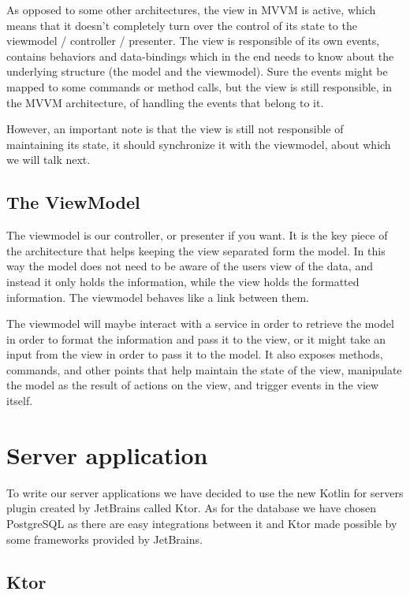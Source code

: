 As opposed to some other architectures, the view in MVVM is active, which means that it doesn't completely turn over the control of its state to the viewmodel / controller / presenter. The view is responsible of its own events, contains behaviors and data-bindings which in the end needs to know about the underlying structure (the model and the viewmodel). Sure the events might be mapped to some commands or method calls, but the view is still responsible, in the MVVM architecture, of handling the events that belong to it.

However, an important note is that the view is still not responsible of maintaining its state, it should synchronize it with the viewmodel, about which we will talk next.

\subsection{The ViewModel}
\label{subsec:ch3sec1subsec3}

\par The viewmodel is our controller, or presenter if you want. It is the key piece of the architecture that helps keeping the view separated form the model. In this way the model does not need to be aware of the users view of the data, and instead it only holds the information, while the view holds the formatted information. The viewmodel behaves like a link between them.

The viewmodel will maybe interact with a service in order to retrieve the model in order to format the information and pass it to the view, or it might take an input from the view in order to pass it to the model. It also exposes methods, commands, and other points that help maintain the state of the view, manipulate the model as the result of actions on the view, and trigger events in the view itself. \cite{viewmodel}

\section{Server application}
\label{subsec:ch3sec2}

\par To write our server applications we have decided to use the new Kotlin for servers plugin created by JetBrains called Ktor. As for the database we have chosen PostgreSQL as there are easy integrations between it and Ktor made possible by some frameworks provided by JetBrains.

\subsection{Ktor}
\label{subsec:ch3sec2subsec1}

